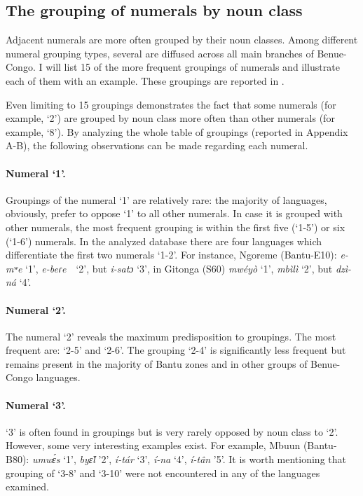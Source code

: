 \subsection{The grouping of numerals by noun class} %
Adjacent numerals are more often grouped by their noun classes. Among different numeral grouping types, several are diffused across all main branches of Benue-Congo. I will list 15 of the more frequent groupings of numerals and illustrate each of them with an example. These groupings are reported in . 

Even limiting  to 15 groupings demonstrates the fact that some numerals (for example, `2') are grouped by noun class more often than other numerals (for example, `8'). By analyzing the whole table of groupings (reported in Appendix A-B), the following observations can be made regarding each numeral. 

\paragraph*{Numeral `1'.} Groupings of the numeral `1' are relatively rare: the majority of languages, obviously, prefer to oppose ‘1’ to all other numerals. In case it is grouped with other numerals, the most frequent grouping is within the first five (‘1-5’) or six (‘1-6’) numerals. In the analyzed database there are four languages which differentiate the first two numerals ‘1-2’. For instance, Ngoreme (Bantu-E10): \textit{e-mʷe} ‘1’, \textit{e-beɾe}~~‘2’, but \textit{i-satɔ} ‘3’, in Gitonga (S60) \textit{mw{\'{e}}y{\`{o}}} ‘1’, \textit{mbìlì} ‘2’, but \textit{dzì-ná} ‘4’. 

\paragraph*{Numeral `2'.} The numeral `2' reveals the maximum predisposition to groupings. The most frequent are: ‘2-5’ and ‘2-6’. The grouping ‘2-4’ is significantly less frequent but remains present in the majority of Bantu zones and in other groups of Benue-Congo languages. 

\paragraph*{Numeral `3'.} `3' is often found in groupings but is very rarely opposed by noun class to `2'. However, some very interesting examples exist. For example, Mbuun (Bantu-B80): \textit{umw{\'{ɛ}}s} ‘1’, \textit{by{\v{ɛ}}l} ’2’, \textit{í-tár} ‘3’, \textit{í-na} ‘4’, \textit{í-tân} ’5’. It is worth mentioning that grouping of ‘3-8’ and ‘3-10’ were not encountered in any of the languages examined. 

